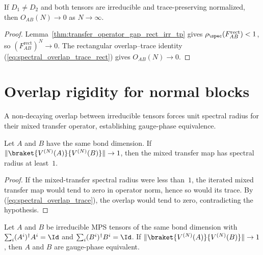 \begin{lemma}%
    \label{thm:overlap_decay_rect_irr_tp}
    \leanok
    If $D_1\neq D_2$ and both tensors are irreducible and trace-preserving
    normalized, then $O_{AB}(N)\to0$ as $N\to\infty$.
\end{lemma}

\begin{proof}\leanok
    Lemma~\ref{thm:transfer_operator_gap_rect_irr_tp} gives
    $\rho_{\spec}(F_{AB}^{\mathrm{rect}})<1$, so
    $(F_{AB}^{\mathrm{rect}})^N\to0$. The rectangular overlap--trace identity
    (\ref{eq:spectral_overlap_trace_rect}) gives $O_{AB}(N)\to0$.
\end{proof}

\section{Overlap rigidity for normal blocks}
\label{sec:bnt_overlap_rigidity}

A non-decaying overlap between irreducible tensors forces unit spectral radius
for their mixed transfer operator, establishing gauge-phase equivalence.

\begin{lemma}%
    \label{lem:overlap_norm_one_implies_spectral_radius_ge_one}
    \leanok
    Let $A$ and $B$ have the same bond dimension. If
    $\|\braket{V^{(N)}(A)}{V^{(N)}(B)}\|\to1$, then the mixed transfer map has
    spectral radius at least~$1$.
\end{lemma}

\begin{proof}\leanok
    If the mixed-transfer spectral radius were less than~$1$, the iterated
    mixed transfer map would tend to zero in operator norm, hence so would its
    trace. By (\ref{eq:spectral_overlap_trace}), the overlap would tend to
    zero, contradicting the hypothesis.
\end{proof}

\begin{lemma}%
    \label{thm:nt_overlap_norm_one_gauge}
    \leanok
    Let $A$ and $B$ be irreducible MPS tensors of the same bond dimension with
    $\sum_i(A^i)^\dagger A^i=\Id$ and
    $\sum_i(B^i)^\dagger B^i=\Id$. If
    $\|\braket{V^{(N)}(A)}{V^{(N)}(B)}\|\to1$, then $A$ and $B$ are
    gauge-phase equivalent.
\end{lemma}

